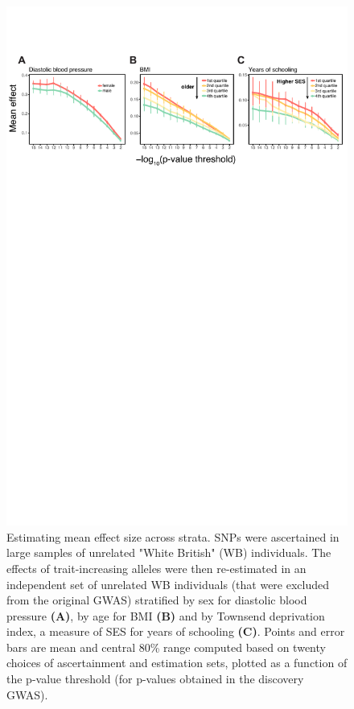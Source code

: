 \documentclass[hidelinks, 12pt]{article}
\begin{document}
\begin{figure}[h]
\centering
\includegraphics[width=\textwidth]{./supp_figures/beta_sweep.pdf}
\caption[Estimating mean effect size across strata]{\small Estimating mean effect size across strata. SNPs were ascertained in large samples of unrelated "White British" (WB) individuals. The effects of trait-increasing alleles were then re-estimated in an independent set of unrelated WB individuals (that were excluded from the original GWAS) stratified by sex for diastolic blood pressure {\bf (A)}, by age for BMI {\bf (B)} and by Townsend deprivation index, a measure of SES for years of schooling {\bf (C)}. Points and error bars are mean and central 80\% range computed based on twenty choices of ascertainment and estimation sets, plotted as a function of the p-value threshold (for p-values obtained in the discovery GWAS).}
\label{fig_p_value_trends}
\end{figure}
\end{document}
